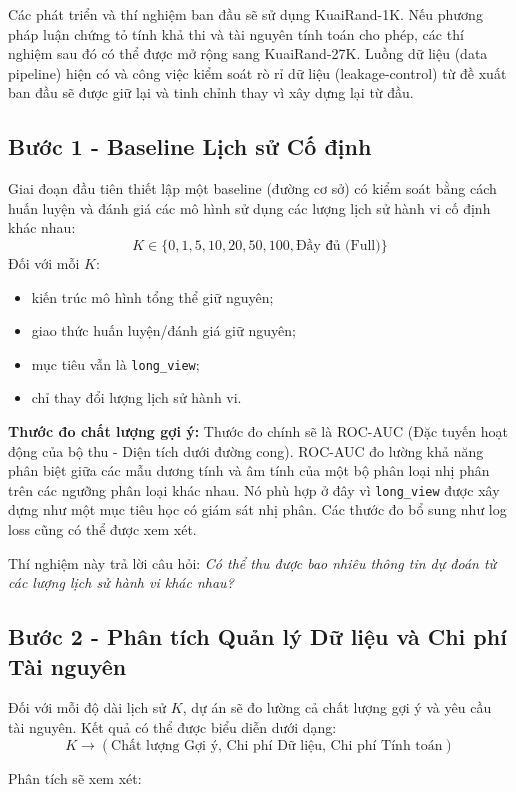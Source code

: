 \documentclass[12pt,a4paper]{article}
\begin{document}
Các phát triển và thí nghiệm ban đầu sẽ sử dụng KuaiRand-1K. Nếu phương pháp luận chứng tỏ tính khả thi và tài nguyên tính toán cho phép, các thí nghiệm sau đó có thể được mở rộng sang KuaiRand-27K. Luồng dữ liệu (data pipeline) hiện có và công việc kiểm soát rò rỉ dữ liệu (leakage-control) từ đề xuất ban đầu sẽ được giữ lại và tinh chỉnh thay vì xây dựng lại từ đầu.

\subsection{Bước 1 - Baseline Lịch sử Cố định}
Giai đoạn đầu tiên thiết lập một baseline (đường cơ sở) có kiểm soát bằng cách huấn luyện và đánh giá các mô hình sử dụng các lượng lịch sử hành vi cố định khác nhau:
\[ K \in \{0, 1, 5, 10, 20, 50, 100, \text{Đầy đủ (Full)}\} \]
Đối với mỗi $K$:
\begin{itemize}
    \item kiến trúc mô hình tổng thể giữ nguyên;
    \item giao thức huấn luyện/đánh giá giữ nguyên;
    \item mục tiêu vẫn là \texttt{long\_view};
    \item chỉ thay đổi lượng lịch sử hành vi.
\end{itemize}

\textbf{Thước đo chất lượng gợi ý:} Thước đo chính sẽ là ROC-AUC (Đặc tuyến hoạt động của bộ thu - Diện tích dưới đường cong). ROC-AUC đo lường khả năng phân biệt giữa các mẫu dương tính và âm tính của một bộ phân loại nhị phân trên các ngưỡng phân loại khác nhau. Nó phù hợp ở đây vì \texttt{long\_view} được xây dựng như một mục tiêu học có giám sát nhị phân. Các thước đo bổ sung như log loss cũng có thể được xem xét.

Thí nghiệm này trả lời câu hỏi: \textit{Có thể thu được bao nhiêu thông tin dự đoán từ các lượng lịch sử hành vi khác nhau?}

\subsection{Bước 2 - Phân tích Quản lý Dữ liệu và Chi phí Tài nguyên}
Đối với mỗi độ dài lịch sử $K$, dự án sẽ đo lường cả chất lượng gợi ý và yêu cầu tài nguyên. Kết quả có thể được biểu diễn dưới dạng:
\[ K \rightarrow (\text{Chất lượng Gợi ý, Chi phí Dữ liệu, Chi phí Tính toán}) \]

Phân tích sẽ xem xét:
\end{document}
